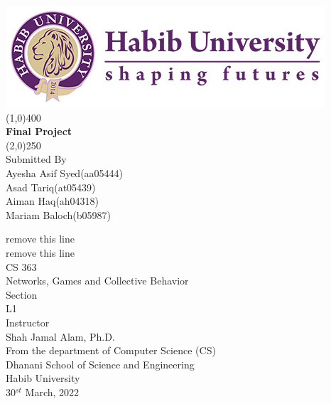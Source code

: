 \begin{titlepage}
    \thispagestyle{empty}
    \begin{center}
    \includegraphics[scale=0.40]{images/HU-LOGO--01.jpg}
    \line(1,0){400}\\
    [6mm]
    \selectfont
    \textbf{Final Project}\\
    \line(2,0){250}\\
    [1cm]
    Submitted By\\
    Ayesha Asif Syed\footnotemark(aa05444)\\
    Asad Tariq\footnotemark[\value{footnote}] (at05439)\\
    Aiman Haq\footnotemark[\value{footnote}] (ah04318)\\
    Mariam Baloch\footnotemark[\value{footnote}] (b05987)\\
    
    
    remove this line\\
     remove this line\\
    [1.0cm]
    CS 363\\
    Networks, Games and Collective Behavior\\ 
    [1.0cm]
    Section\\
    L1\\
    [1.0cm]
    Instructor\\
    Shah Jamal Alam, Ph.D.\\
    [1.0cm]
    From the department of Computer Science (CS)\\
    Dhanani School of Science and Engineering\\
    Habib University\\
    [0.2cm]
    30$^{st}$ March, 2022
    \end{center} 
    \end{titlepage}